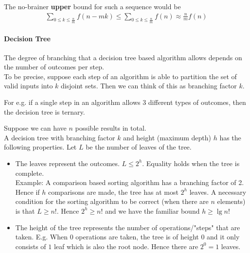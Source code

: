 \documentclass{article}
\begin{document}
The no-brainer \textbf{upper} bound for such a sequence would be
\begin{align*}
	\sum_{0\leq k\leq \frac{n}{m}}f(n-mk) \leq \sum_{0\leq k\leq \frac{n}{m}}f(n)\approx \frac{n}{m}f(n) 
\end{align*}

\paragraph{Decision Tree}
The degree of branching that a decision tree based algorithm allows depends on the number of outcomes per step.\\
To be precise, suppose each step of an algorithm is able to partition the set of valid inputs into $k$ disjoint sets. Then we can think of this as branching factor $k$.

For e.g. if a single step in an algorithm allows 3 different types of outcomes, then the decision tree is ternary.

Suppose we can have $n$ possible results in total.\\
A decision tree with branching factor $k$ and height (maximum depth) $h$ has the following properties. Let $L$ be the number of leaves of the tree.
\begin{itemize}
	\item The leaves represent the outcomes. $L\leq 2^h$. Equality holds when the tree is complete.\\
	Example: A comparison based sorting algorithm has a branching factor of 2. Hence if $h$ comparisons are made, the tree has at most $2^h$ leaves. A necessary condition for the sorting algorithm to be correct (when there are $n$ elements) is that $L\geq n!$. Hence $2^h\geq n!$ and we have the familiar bound $h\geq \lg n!$
	\item The height of the tree represents the number of operations/"steps" that are taken. E.g. When $0$ operations are taken, the tree is of height $0$ and it only consists of $1$ leaf which is also the root node. Hence there are $2^0 = 1$ leaves.
\end{itemize}
\end{document}
